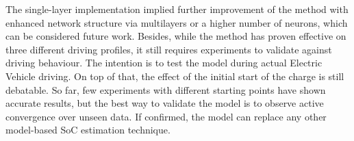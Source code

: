 %
%
The single-layer implementation implied further improvement of the method with enhanced network structure via multilayers or a higher number of neurons, which can be considered future work.
Besides, while the method has proven effective on three different driving profiles, it still requires experiments to validate against driving behaviour.
The intention is to test the model during actual Electric Vehicle driving.
On top of that, the effect of the initial start of the charge is still debatable.
So far, few experiments with different starting points have shown accurate results, but the best way to validate the model is to observe active convergence over unseen data.
If confirmed, the model can replace any other model-based SoC estimation technique.
